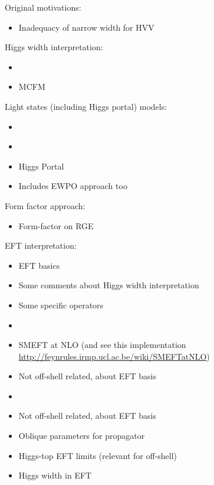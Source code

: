 \documentclass[11pt,letterpaper]{article}
\begin{document}
Original motivations:
\begin{itemize}
  \item \cite{Kauer:2012hd} Inadequacy of narrow width for HVV
\end{itemize}

Higgs width interpretation:
\begin{itemize}  
  \item \cite{Caola:2013yja}
  \item \cite{Campbell:2013una} MCFM
\end{itemize}

Light states (including Higgs portal) models:
\begin{itemize}
  \item \cite{Englert:2014aca}
  \item \cite{Englert:2014ffa}
  \item \cite{Goncalves:2017iub} Higgs Portal
  \item \cite{Englert:2020gcp} Includes EWPO approach too
\end{itemize}

Form factor approach:
\begin{itemize}
  \item \cite{Goncalves:2018pkt} Form-factor on RGE
\end{itemize}

EFT interpretation:
\begin{itemize}
  \item \cite{Grzadkowski:2010es} EFT basics
  \item \cite{Azatov:2014jga} Some comments about Higgs width interpretation
  \item \cite{Gainer:2014hha} Some specific operators
  \item \cite{Azatov:2016xik}
  \item \cite{Passarino:2016pzb} SMEFT at NLO (and see this implementation \url{http://feynrules.irmp.ucl.ac.be/wiki/SMEFTatNLO})
  \item \cite{Falkowski:2015wzab} Not off-shell related, about EFT basis
  \item \cite{Contino:2016jqw}
  \item \cite{Falkowski:2001958} Not off-shell related, about EFT basis
  \item \cite{Englert:2019zmt} Oblique parameters for propagator
  \item \cite{Brivio:2019ius} Higgs-top EFT limits (relevant for off-shell)
  \item \cite{Brivio:2019myy} Higgs width in EFT
\end{itemize}
\end{document}
